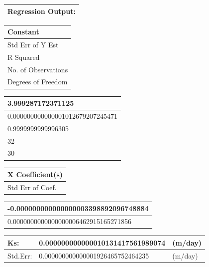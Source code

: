 \documentclass[11pt,a4paper]{article}
\begin{document}
\begin{table}[h]
\begin{tabular}{|l|}
\hline
Regression Output: \\ \hline
\end{tabular}
\end{table}

\begin{table}[h]
\begin{tabular}{|l|}
\hline
Constant \\ \hline
Std Err of Y Est \\ \hline
R Squared \\ \hline
No. of Observations \\ \hline
Degrees of Freedom \\ \hline
\end{tabular}
\end{table}

\begin{table}[h]
\begin{tabular}{|l|}
\hline
3.999287172371125 \\ \hline
0.000000000000001012679207245471 \\ \hline
0.9999999999996305 \\ \hline
32 \\ \hline
30 \\ \hline
\end{tabular}
\end{table}

\begin{table}[h]
\begin{tabular}{|l|}
\hline
X Coefficient(s) \\ \hline
Std Err of Coef. \\ \hline
\end{tabular}
\end{table}

\begin{table}[h]
\begin{tabular}{|l|}
\hline
-0.000000000000000003398892096748884 \\ \hline
0.0000000000000000006462915165271856 \\ \hline
\end{tabular}
\end{table}

\begin{table}[h]
\begin{tabular}{|l|l|l|}
\hline
Ks: & 0.000000000000010131417561989074 & (m/day) \\ \hline
Std.Err: & 0.000000000000001926465752464235 & (m/day) \\ \hline
\end{tabular}
\end{table}
\end{document}
